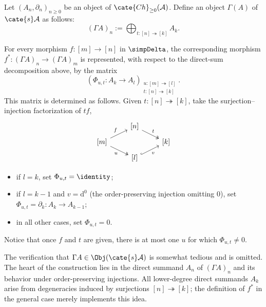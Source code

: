 \begin{definition}\label{def:DK-Gamma}
	Let $(A_n,\partial_n)_{n\geq0}$ be an object of
	$\cate{Ch}_{\geq0}(\mathcal{A})$. Define an object $\Gamma(A)$ of
	$\cate{s}\mathcal{A}$ as follows:
	\[ (\Gamma A)_n := \bigoplus_{t: [n] \twoheadrightarrow [k]} A_k. \]

	For every morphism $f:[m]\to[n]$ in $\simpDelta$, the corresponding
	morphism $f^*:(\Gamma A)_n\to(\Gamma A)_m$ is represented, with respect
	to the direct-sum decomposition above, by the matrix
	\[ \left( \Phi_{u, t} : A_k \to A_l \right)_{\substack{ u: [m] \twoheadrightarrow [l] \\ t: [n] \twoheadrightarrow [k] }}. \]
	This matrix is determined as follows. Given
	$t:[n]\twoheadrightarrow[k]$, take the surjection--injection
	factorization of $tf$,
	\begin{equation}\label{eqn:Dold-Kan-epi-mono}\begin{tikzcd}[row sep=tiny]
		& {[n]} \arrow[twoheadrightarrow, rd, "t"] & \\
		{[m]} \arrow[ru, "f"] \arrow[twoheadrightarrow, rd, "u"'] & & {[k]} \\
		& {[l]} \arrow[hookrightarrow, ru, "v"'] &
	\end{tikzcd}\end{equation}
	\begin{itemize}
		\item if $l=k$, set $\Phi_{u,t}=\identity$;
		\item if $l=k-1$ and $v=\mathrm{d}^0$ (the order-preserving
		injection omitting $0$), set
		$\Phi_{u,t}=\partial_k:A_k\to A_{k-1}$;
		\item in all other cases, set $\Phi_{u,t}=0$.
	\end{itemize}
	Notice that once $f$ and $t$ are given, there is at most one $u$ for which
	$\Phi_{u,t}\neq0$.
\end{definition}

The verification that $\Gamma A\in\Obj(\cate{s}\mathcal{A})$ is somewhat
tedious and is omitted. The heart of the construction lies in the direct
summand $A_n$ of $(\Gamma A)_n$ and its behavior under order-preserving
injections. All lower-degree direct summands $A_k$ arise from degeneracies
induced by surjections $[n]\twoheadrightarrow[k]$; the definition of $f^*$
in the general case merely implements this idea.

